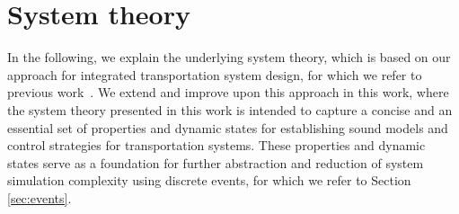 \documentclass[graybox]{svmult}
\begin{document}
\section{System theory}
\label{sec:theory}
In the following, we explain the underlying system theory, which is based on our approach for integrated transportation system design, for which we refer to previous work~\cite{Ascher2014,Ascher2015,Ascher2016,Ascher2017}. We extend and improve upon this approach in this work, where the system theory presented in this work is intended to capture a concise and an essential set of properties and dynamic states for establishing sound models and control strategies for transportation systems. These properties and dynamic states serve as a foundation for further abstraction and reduction of system simulation complexity using discrete events, for which we refer to Section \ref{sec:events}.



\end{document}
